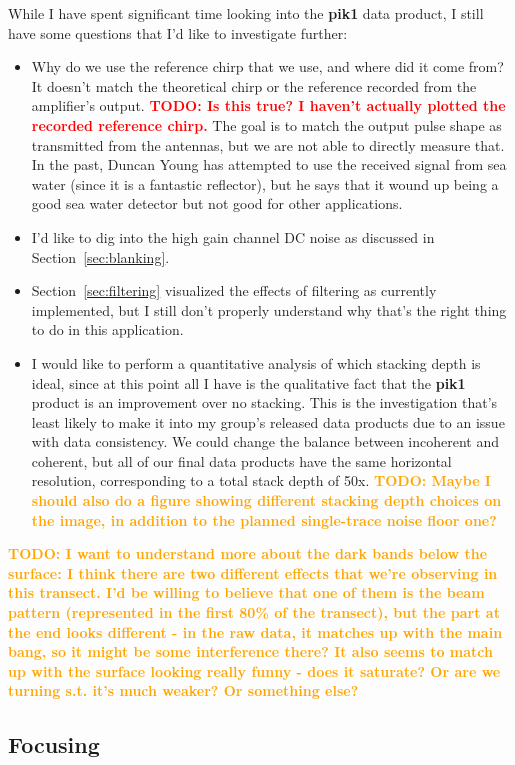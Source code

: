 \documentclass[11pt]{article}
\newcommand{\todo}[1]{\ifthenelse{\boolean{include-todos}} {\textcolor{Red}{\textbf{TODO: #1}}}{}}
\newcommand{\future}[1]{\ifthenelse{\boolean{include-future}} {\textcolor{Orange}{\textbf{TODO: #1}}}{}}
\newcommand{\secref}[1]{Section~\ref{#1}}
\begin{document}
While I have spent significant time looking into the \textbf{pik1} data product, I still have some questions that I'd like to investigate further:
\begin{itemize}
\item Why do we use the reference chirp that we use, and where did it come from? It doesn't match the theoretical chirp or the reference recorded from the amplifier's output. \todo{Is this true? I haven't actually plotted the recorded reference chirp.} The goal is to match the output pulse shape as transmitted from the antennas, but we are not able to directly measure that. In the past, Duncan Young has attempted to use the received signal from sea water (since it is a fantastic reflector), but he says that it wound up being a good sea water detector but not good for other applications.
\item I'd like to dig into the high gain channel DC noise as discussed in \secref{sec:blanking}.
\item \secref{sec:filtering} visualized the effects of filtering as currently implemented, but I still don't properly understand why that's the right thing to do in this application.
\item I would like to perform a quantitative analysis of which stacking depth is ideal, since at this point all I have is the qualitative fact that the \textbf{pik1} product is an improvement over no stacking. This is the investigation that's least likely to make it into my group's released data products due to an issue with data consistency. We could change the balance between incoherent and coherent, but all of our final data products have the same horizontal resolution, corresponding to a total stack depth of 50x. \future{Maybe I should also do a figure showing different stacking depth choices on the image, in addition to the planned single-trace noise floor one?}
\end{itemize}

\future{I want to understand more about the dark bands below the surface: I think there are two different effects that we're observing in this transect. I'd be willing to believe that one of them is the beam pattern (represented in the first 80\% of the transect), but the part at the end looks different - in the raw data, it matches up with the main bang, so it might be some interference there? It also seems to match up with the surface looking really funny - does it saturate? Or are we turning s.t. it's much weaker? Or something else?}

\subsection{Focusing}
\label{sec:focusing}
\end{document}
